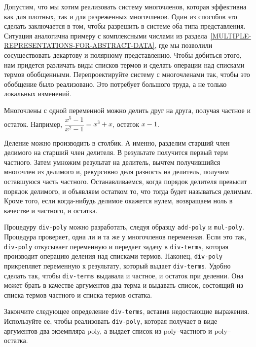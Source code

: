 \begin{exercise}{2.90}\label{EX2.90}%
Допустим, что мы хотим реализовать систему многочленов,
которая эффективна как для плотных, так и для разреженных многочленов.  Один
из способов это сделать заключается в том, чтобы разрешить в системе
оба типа представления.  Ситуация аналогична примеру с комплексными
числами из 
раздела~\ref{MULTIPLE-REPRESENTATIONS-FOR-ABSTRACT-DATA},
где мы 
позволили сосуществовать декартову и полярному представлению.  Чтобы
добиться этого, нам придется различать виды списков термов и сделать
операции над списками термов обобщенными.  Перепроектируйте систему с
многочленами так, чтобы это обобщение было реализовано.  Это потребует большого труда, а не только  локальных изменений.
\end{exercise}

\begin{exercise}{2.91}\label{EX2.91}%
  Многочлены с одной переменной можно делить друг на
друга, получая частное и остаток.  Например, 
$\dfrac{x^5 - 1}{x^2 - 1} = x^3 + x$, остаток 
$x - 1$.%

Деление можно производить в столбик.  А именно,
разделим старший член делимого на старший член делителя.  В
результате получится первый терм частного.  Затем умножим результат
на делитель, вычтем получившийся многочлен из делимого и, рекурсивно
деля разность на делитель, получим оставшуюся часть
частного. Останавливаемся, когда порядок делителя превысит
порядок делимого, и объявляем остатком то, что тогда будет называться делимым.
Кроме того, если когда-нибудь делимое окажется нулем,
возвращаем ноль в качестве и частного, и остатка.

Процедуру {\tt div-poly} можно разработать,
следуя образцу {\tt add-poly} и
{\tt mul-poly}. Процедура проверяет, одна ли и та же у
многочленов переменная.  Если это так, {\tt div-poly}
откусывает переменную и передает задачу в {\tt div-terms},
которая производит операцию деления над списками термов. Наконец,
{\tt div-poly} прикрепляет переменную к результату, который
выдает  {\tt div-terms}.  Удобно сделать так, чтобы
{\tt div-terms} выдавала и частное, и остаток при делении.  Она
может брать в качестве аргументов два терма и выдавать список, состоящий из
списка термов частного и списка термов остатка.

Закончите следующее определение {\tt div-terms},
вставив недостающие выражения.  Используйте ее, чтобы реализовать
{\tt div-poly}, которая получает в виде аргументов два
экземпляра poly, а выдает список из poly--частного и poly--остатка.


\end{exercise}
